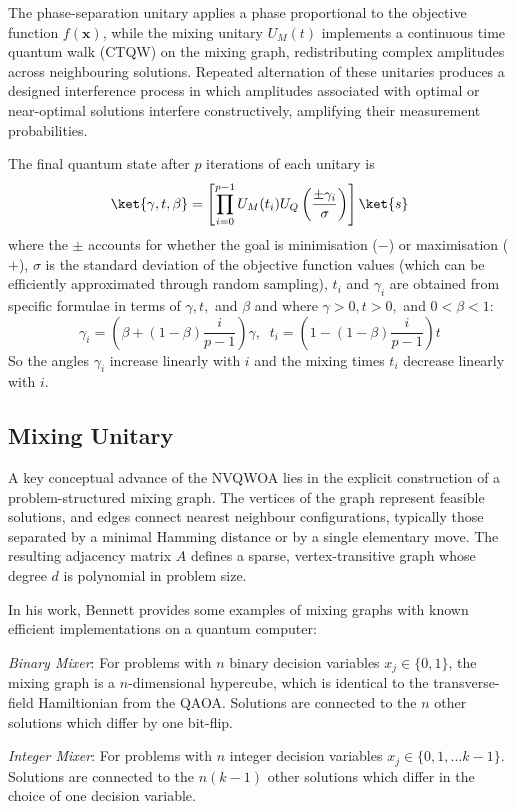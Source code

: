 The phase-separation unitary applies a phase proportional to the objective function $f(\mathbf{x})$, while the mixing unitary $U_M(t)$ implements a continuous time quantum walk (CTQW) on the mixing graph, redistributing complex amplitudes across neighbouring solutions. Repeated alternation of these unitaries produces a designed interference process in which amplitudes associated with optimal or near-optimal solutions interfere constructively, amplifying their measurement probabilities.

The final quantum state after $p$ iterations of each unitary is
$$\ket{\gamma,t,\beta}=\left[\prod_{i=0}^{p-1} U_M(t_i)U_Q\left(\frac{\pm \gamma_i}{\sigma}\right)\right] \ket{s}$$
where the $\pm$ accounts for whether the goal is minimisation ($-$) or maximisation ($+$), $\sigma$ is the standard deviation of the objective function values (which can be efficiently approximated through random sampling), $t_i$ and $\gamma_i$ are obtained from specific formulae in terms of $\gamma, t,$ and $\beta$ and where $\gamma>0, t>0,$ and $0<\beta<1$:
$$\gamma_i=\left(\beta + (1-\beta)\frac{i}{p-1} \right)\gamma,\;\;t_i=\left(1- (1-\beta)\frac{i}{p-1} \right)t$$
So the angles $\gamma_i$ increase linearly with $i$ and the mixing times $t_i$ decrease linearly with $i$.

\subsection{Mixing Unitary}
A key conceptual advance of the NVQWOA lies in the explicit construction of a problem-structured mixing graph. The vertices of the graph represent feasible solutions, and edges connect nearest neighbour configurations, typically those separated by a minimal Hamming distance or by a single elementary move. The resulting adjacency matrix $A$ defines a sparse, vertex-transitive graph whose degree $d$ is polynomial in problem size.

In his work, Bennett provides some examples of mixing graphs with known efficient implementations on a quantum computer:

\textit{Binary Mixer}: For problems with $n$ binary decision variables $x_j\in\{0,1\}$, the mixing graph is a $n$-dimensional hypercube, which is identical to the transverse-field Hamiltionian from the QAOA. Solutions are connected to the $n$ other solutions which differ by one bit-flip.

\textit{Integer Mixer}: For problems with $n$ integer decision variables $x_j\in\{0,1,...k-1\}$. Solutions are connected to the $n(k-1)$ other solutions which differ in the choice of one decision variable.

